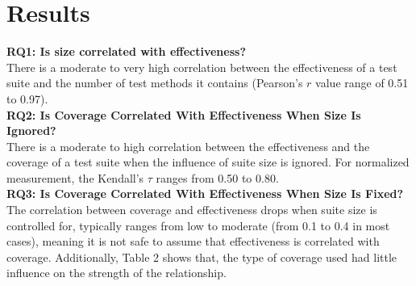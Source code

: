 \section{Results}

\textbf{RQ1: Is size correlated with effectiveness?}\\
There is a moderate to very high correlation between the effectiveness of a test suite and the number of test methods it contains (Pearson's $r$ value range of 0.51 to 0.97).\\

\textbf{RQ2: Is Coverage Correlated With Effectiveness When Size Is Ignored?}\\
There is a moderate to high correlation between the effectiveness and the coverage of a test suite when the influence of suite size is ignored. For normalized measurement, the Kendall's $\tau$ ranges from 0.50 to 0.80.\\

\textbf{RQ3: Is Coverage Correlated With Effectiveness When Size Is Fixed?}\\
The correlation between coverage and effectiveness drops when suite size is controlled for, typically ranges from low to moderate (from 0.1 to 0.4 in most cases), meaning it is not safe to assume that effectiveness is correlated with coverage. Additionally, Table 2 shows that, the type of coverage used had little influence on the strength of the relationship.

